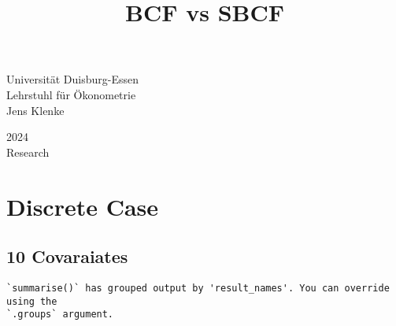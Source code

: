 \documentclass[ngerman,]{article}
\title{\center BCF vs SBCF  }
\date{}
\begin{document}
%    


{%

{

\vskip 40pt\relax \normalsize\fontsize{11}{12}

\begin{minipage}[t]{.49\textwidth}
Universität Duisburg-Essen\\
Lehrstuhl für Ökonometrie\\
Jens Klenke \hskip 15pt \emph{\small }   
\end{minipage}%
%
\hfill
%
\begin{minipage}[t]{.49\textwidth}
  \begin{flushright}
    2024\\
    Research\\
  \end{flushright}
\end{minipage}

\vspace{20pt}

}

\setlength{\parindent}{0pt}
\thispagestyle{plain}
{\fontsize{10}{10}\selectfont\raggedright 
{\let\newpage\relax\maketitle}

}


}

\vskip 8.5pt





\vskip 6.5pt


\noindent  \hypertarget{discrete-case}{%
\section{Discrete Case}\label{discrete-case}}

\hypertarget{covaraiates}{%
\subsection{10 Covaraiates}\label{covaraiates}}

\begin{verbatim}
`summarise()` has grouped output by 'result_names'. You can override using the
`.groups` argument.
\end{verbatim}
\end{document}
